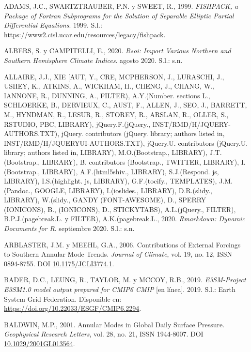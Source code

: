 \documentclass[12pt,oneside,a4paper]{reedthesis}
\newlength{\cslhangindent}
\newenvironment{CSLReferences}[2] %
 {%
  \setlength{\parindent}{0pt}
  \ifodd #1 \everypar{\setlength{\hangindent}{\cslhangindent}}\ignorespaces\fi
  \ifnum #2 > 0
  \setlength{\parskip}{#2\baselineskip}
  \fi
 }%
 {}
\begin{document}
\hypertarget{refs}{}
\begin{CSLReferences}{1}{0}
\leavevmode{}%
ADAMS, J.C., SWARTZTRAUBER, P.N. y SWEET, R., 1999. \emph{{FISHPACK}, a Package of {Fortran} Subprograms for the Solution of Separable Elliptic Partial Differential Equations}. 1999. S.l.: https://www2.cisl.ucar.edu/resources/legacy/fishpack.

\leavevmode{}%
ALBERS, S. y CAMPITELLI, E., 2020. \emph{Rsoi: {Import Various Northern} and {Southern Hemisphere Climate Indices}}. agosto 2020. S.l.: s.n.

\leavevmode{}%
ALLAIRE, J.J., XIE {[}AUT, Y., CRE, MCPHERSON, J., LURASCHI, J., USHEY, K., ATKINS, A., WICKHAM, H., CHENG, J., CHANG, W., IANNONE, R., DUNNING, A., FILTER), A.Y.(Number. sections L., SCHLOERKE, B., DERVIEUX, C., AUST, F., ALLEN, J., SEO, J., BARRETT, M., HYNDMAN, R., LESUR, R., STOREY, R., ARSLAN, R., OLLER, S., RSTUDIO, PBC, LIBRARY), jQuery.F.(jQuery., INST/RMD/H/JQUERY-AUTHORS.TXT), jQuery. contributors (jQuery. library; authors listed in, INST/RMD/H/JQUERYUI-AUTHORS.TXT), jQuery.U. contributors (jQuery.U. library; authors listed in, LIBRARY), M.O.(Bootstrap., LIBRARY), J.T.(Bootstrap., LIBRARY), B. contributors (Bootstrap., TWITTER, LIBRARY), I.(Bootstrap., LIBRARY), A.F.(html5shiv., LIBRARY), S.J.(Respond. js, LIBRARY), I.S.(highlight. js, LIBRARY), G.F.(tocify., TEMPLATES), J.M.(Pandoc., GOOGLE, LIBRARY), I.(ioslides., LIBRARY), D.R.(slidy., LIBRARY), W.(slidy., GANDY (FONT-AWESOME), D., SPERRY (IONICONS), B., (IONICONS), D., STICKYTABS), A.L.(jQuery., FILTER), B.P.J.(pagebreak.L. y FILTER), A.K.(pagebreak.L., 2020. \emph{Rmarkdown: {Dynamic Documents} for {R}}. septiembre 2020. S.l.: s.n.

\leavevmode{}%
ARBLASTER, J.M. y MEEHL, G.A., 2006. Contributions of {External Forcings} to {Southern Annular Mode Trends}. \emph{Journal of Climate}, vol. 19, no. 12, ISSN 0894-8755. DOI \href{https://doi.org/10.1175/JCLI3774.1}{10.1175/JCLI3774.1}.

\leavevmode{}%
BADER, D.C., LEUNG, R., TAYLOR, M. y MCCOY, R.B., 2019. \emph{E3SM-Project E3SM1.0 model output prepared for CMIP6 CMIP} {[}en línea{]}. 2019. S.l.: Earth System Grid Federation. Disponible en: \url{https://doi.org/10.22033/ESGF/CMIP6.2294}.

\leavevmode{}%
BALDWIN, M.P., 2001. Annular Modes in Global Daily Surface Pressure. \emph{Geophysical Research Letters}, vol. 28, no. 21, ISSN 1944-8007. DOI \href{https://doi.org/10.1029/2001GL013564}{10.1029/2001GL013564}.


\end{CSLReferences}
\end{document}
